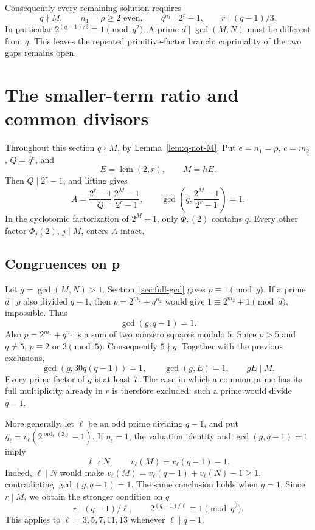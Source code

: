 \documentclass[11pt]{article}
\begin{document}
Consequently every remaining solution requires
\[
\boxed{q\nmid M,\qquad n_1=\rho\ge2\text{ even},\qquad
q^{n_1}\mid2^r-1,\qquad r\mid(q-1)/3.}
\]
In particular $2^{(q-1)/3}\equiv1\pmod{q^2}$.
A prime $d\mid\gcd(M,N)$ must be different from $q$.
This leaves the repeated primitive-factor branch; coprimality of
the two gaps remains open.

\section{The smaller-term ratio and common divisors}
\label{sec:additional-returns}
Throughout this section $q\nmid M$, by Lemma~\ref{lem:q-not-M}.
Put $e=n_1=\rho$, $c=m_2$, $Q=q^e$, and
\[
E=\operatorname{lcm}(2,r),\qquad M=hE.
\]
Then $Q\mid2^r-1$, and lifting gives
\[
A=\frac{2^r-1}{Q}\,\frac{2^M-1}{2^r-1},\qquad
\gcd\left(q,\frac{2^M-1}{2^r-1}\right)=1.
\]
In the cyclotomic factorization of $2^M-1$, only $\Phi_r(2)$ contains
$q$. Every other factor $\Phi_j(2)$, $j\mid M$, enters $A$ intact.

\subsection{Congruences on p}
\label{sec:p-common-gap}
Let $g=\gcd(M,N)>1$. Section~\ref{sec:full-gcd} gives
$p\equiv1\pmod g$. If a prime $d\mid g$ also divided $q-1$,
then $p=2^{m_2}+q^{n_2}$ would give
$1\equiv2^{m_2}+1\pmod d$, impossible. Thus
\[
\gcd(g,q-1)=1.
\]
Also $p=2^{m_1}+q^{n_1}$ is a sum of two nonzero squares modulo $5$.
Since $p>5$ and $q\ne5$, $p\equiv2$ or $3\pmod5$.
Consequently $5\nmid g$. Together with the previous exclusions,
\begin{equation}\label{eq:common-gap-coprimality}
\boxed{\gcd(g,30q(q-1))=1,\qquad \gcd(g,E)=1,\qquad gE\mid M.}
\end{equation}
Every prime factor of $g$ is at least $7$.
The case in which a common prime has its full multiplicity already
in $r$ is therefore excluded: such a prime would divide $q-1$.

More generally, let $\ell$ be an odd prime dividing $q-1$, and put
$\eta_\ell=v_\ell(2^{\operatorname{ord}_\ell(2)}-1)$.
If $\eta_\ell=1$, the valuation identity and
$\gcd(g,q-1)=1$ imply
\begin{equation}\label{eq:ordinary-q-minus-one}
\boxed{\ell\nmid N,\qquad v_\ell(M)=v_\ell(q-1)-1.}
\end{equation}
Indeed, $\ell\mid N$ would make
$v_\ell(M)=v_\ell(q-1)+v_\ell(N)-1\ge1$, contradicting
$\gcd(g,q-1)=1$. The same conclusion holds when $g=1$.
Since $r\mid M$, we obtain the stronger condition on $q$
\[
r\mid(q-1)/\ell,\qquad
2^{(q-1)/\ell}\equiv1\pmod{q^2}.
\]
This applies to $\ell=3,5,7,11,13$ whenever $\ell\mid q-1$.
\end{document}
